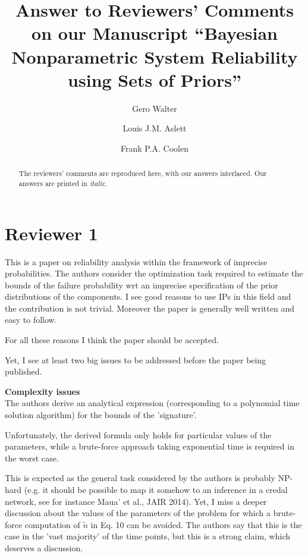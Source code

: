 \documentclass[12pt, a4paper]{elsarticle}
\begin{document}
\begin{frontmatter}
\title{Answer to Reviewers' Comments on our Manuscript ``Bayesian Nonparametric System Reliability\\ using Sets of Priors''}

\author[ein]{Gero Walter}
\author[oxf]{Louis J.M. Aslett}
\author[dur]{Frank P.A. Coolen}

\address[ein]{School of Industrial Engineering, Eindhoven University of Technology, Eindhoven, NL}
\address[oxf]{Department of Statistics, University of Oxford, Oxford, UK}
\address[dur]{Department of Mathematical Sciences, Durham University, Durham, UK}

\begin{abstract}
The reviewers' comments are reproduced here, with our answers interlaced. Our answers are printed in \emph{italic}.
\end{abstract}
\end{frontmatter}

\section*{Reviewer 1}

This is a paper on reliability analysis within the framework of imprecise probabilities. The authors consider the optimization task required to estimate the bounds of the failure probability wrt an imprecise specification of the prior distributions of the components. I see good reasons to use IPs in this field and the contribution is not trivial. Moreover the paper is generally well written and easy to follow.

For all these reasons I think the paper should be accepted.

Yet, I see at least two big issues to be addressed before the paper being published.

\medskip
\textbf{Complexity issues}\\
The authors derive an analytical expression (corresponding to a polynomial time solution algorithm) for the bounds of the 'signature'.

Unfortunately, the derived formula only holds for particular values of the parameters, while a brute-force approach taking exponential time is required in the worst case.

This is expected as the general task considered by the authors is probably NP-hard (e.g. it should be possible to map it somehow to an inference in a credal network, see for instance Maua' et al., JAIR 2014). Yet, I miss a deeper discussion about the values of the parameters of the problem for which a brute-force computation of $\tilde{n}$ in Eq. 10 can be avoided. The authors say that this is the case in the 'vast majority' of the time points, but this is a strong claim, which deserves a discussion.
\end{document}
